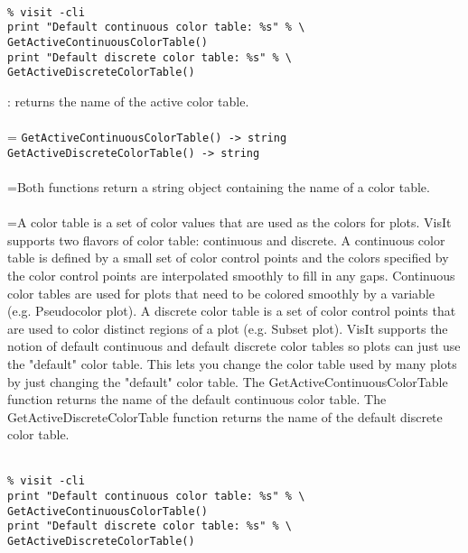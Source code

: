 \documentclass[10pt,a4paper]{report}
\begin{document}
\\[-6mm]
\begin{verbatim}% visit -cli
print "Default continuous color table: %s" % \
GetActiveContinuousColorTable()
print "Default discrete color table: %s" % \
GetActiveDiscreteColorTable()
\end{verbatim}
\newpage


{}
: returns the name of the active color table.\\[-3mm]

 \\ 
\hangindent=\parindent 
\verb!GetActiveContinuousColorTable() -> string!\\ 
\verb!GetActiveDiscreteColorTable() -> string!\\ [-3mm]

 \\ 
\hangindent=\parindent Both functions return a string object containing the name of a color table. \\[-3mm] 

 \\ 
\hangindent=\parindent A color table is a set of color values that are used as the colors for plots. VisIt supports two flavors of color table: continuous and discrete. A continuous color table is defined by a small set of color control points and the colors specified by the color control points are interpolated smoothly to fill in any gaps. Continuous color tables are used for plots that need to be colored smoothly by a variable (e.g. Pseudocolor plot). A discrete color table is a set of color control points that are used to color distinct regions of a plot (e.g. Subset plot). VisIt supports the notion of default continuous and default discrete color tables so plots can just use the "default" color table. This lets you change the color table used by many plots by just changing the "default" color table. The GetActiveContinuousColorTable function returns the name of the default continuous color table. The GetActiveDiscreteColorTable function returns the name of the default discrete color table. \\[-3mm] 

\\[-6mm]
\begin{verbatim}% visit -cli
print "Default continuous color table: %s" % \
GetActiveContinuousColorTable()
print "Default discrete color table: %s" % \
GetActiveDiscreteColorTable()
\end{verbatim}
\newpage
\end{document}
